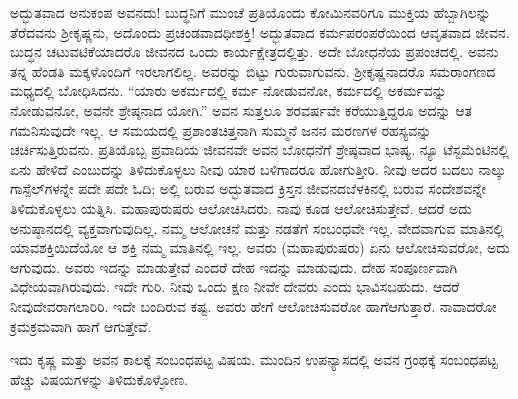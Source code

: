 ಅದ್ಭುತವಾದ ಅನುಕಂಪ ಅವನದು! ಬುದ್ಧನಿಗೆ ಮುಂಚೆ ಪ್ರತಿಯೊಂದು ಕೋಮಿನವರಿಗೂ ಮುಕ್ತಿಯ ಹೆಬ್ಬಾಗಿಲನ್ನು ತೆರೆದವನು ಶ‍್ರೀಕೃಷ್ಣನು, ಅದೊಂದು ಪ್ರಚಂಡವಾದ\break ಧೀಶಕ್ತಿ! ಅದ್ಭುತವಾದ ಕರ್ಮಪರಂಪರೆಯಿಂದ ಆವೃತವಾದ ಜೀವನ. ಬುದ್ಧನ ಚಟುವಟಿಕೆ\-ಯಾದರೊ ಜೀವನದ ಒಂದು ಕಾರ್ಯಕ್ಷೇತ್ರದಲ್ಲಿತ್ತು. ಅದೇ ಬೋಧನೆಯ ಪ್ರಪಂಚದಲ್ಲಿ. ಅವನು ತನ್ನ ಹೆಂಡತಿ ಮಕ್ಕಳೊಂದಿಗೆ ಇರಲಾಗಲಿಲ್ಲ. ಅವರನ್ನು ಬಿಟ್ಟು ಗುರುವಾಗುವನು. ಶ‍್ರೀಕೃಷ್ಣನಾದರೊ ಸಮರಾಂಗಣದ ಮಧ್ಯದಲ್ಲಿ ಬೋಧಿಸಿದನು. “ಯಾರು ಅಕರ್ಮದಲ್ಲಿ ಕರ್ಮ ನೋಡುವನೋ, ಕರ್ಮದಲ್ಲಿ ಅಕರ್ಮವನ್ನು ನೋಡುವನೋ, ಅವನೇ ಶ್ರೇಷ್ಠನಾದ ಯೋಗಿ.” ಅವನ ಸುತ್ತಲೂ ಶರವರ್ಷವೇ ಕರೆಯುತ್ತಿದ್ದರೂ ಅದನ್ನು ಆತ ಗಮನಿಸುವುದೇ ಇಲ್ಲ. ಆ ಸಮಯದಲ್ಲಿ ಪ್ರಶಾಂತಚಿತ್ತನಾಗಿ ಸುಮ್ಮನೆ ಜನನ ಮರಣಗಳ ರಹಸ್ಯವನ್ನು ಚರ್ಚಿಸುತ್ತಿರುವನು. ಪ್ರತಿಯೊಬ್ಬ ಪ್ರವಾದಿಯ ಜೀವನವೇ ಅವನ ಬೋಧನೆಗೆ ಶ್ರೇಷ್ಠವಾದ ಭಾಷ್ಯ. ನ್ಯೂ ಟೆಸ್ಟಮೆಂಟಿನಲ್ಲಿ ಏನು ಹೇಳಿದೆ ಎಂಬುದನ್ನು ತಿಳಿದುಕೊಳ್ಳಲು ನೀವು ಯಾರ ಬಳಿಗಾದರೂ ಹೋಗುತ್ತೀರಿ. ನೀವು ಅದರ ಬದಲು ನಾಲ್ಕು ಗಾಸ್ಪೆಲ್​ಗಳನ್ನೇ ಪದೇ ಪದೇ ಓದಿ; ಅಲ್ಲಿ ಬರುವ ಅದ್ಭುತವಾದ ಕ್ರಿಸ್ತನ ಜೀವನದ\break ಬೆಳಕಿನಲ್ಲಿ ಬರುವ ಸಂದೇಶವನ್ನೇ ತಿಳಿದುಕೊಳ್ಳಲು ಯತ್ನಿಸಿ. ಮಹಾಪುರುಷರು ಆಲೋಚಿಸಿದರು. ನಾವು ಕೂಡ ಆಲೋಚಿಸುತ್ತೇವೆ. ಆದರೆ ಅದು ಅನುಷ್ಠಾನದಲ್ಲಿ ವ್ಯಕ್ತವಾಗುವುದಿಲ್ಲ. ನಮ್ಮ ಆಲೋಚನೆ ಮತ್ತು ನಡತೆಗೆ ಸಂಬಂಧವೇ ಇಲ್ಲ. ವೇದವಾಗುವ ಮಾತಿನಲ್ಲಿ ಯಾವ\break ಶಕ್ತಿಯಿದೆಯೋ ಆ ಶಕ್ತಿ ನಮ್ಮ ಮಾತಿನಲ್ಲಿ ಇಲ್ಲ. ಅವರು (ಮಹಾಪುರುಷರು) ಏನು ಆಲೋಚಿಸುವರೋ, ಅದು ಆಗುವುದು. ಅವರು ಇದನ್ನು ಮಾಡುತ್ತೇವೆ ಎಂದರೆ ದೇಹ ಇದನ್ನು ಮಾಡುವುದು. ದೇಹ ಸಂಪೂರ್ಣವಾಗಿ ವಿಧೇಯವಾಗಿರುವುದು. ಇದೇ ಗುರಿ. ನೀವು ಒಂದು ಕ್ಷಣ ನೀವೇ ದೇವರು ಎಂದು ಭಾವಿಸಬಹುದು. ಆದರೆ ನೀವು\break ದೇವರಾಗಲಾರಿರಿ. ಇದೇ ಬಂದಿರುವ ಕಷ್ಟ. ಅವರು ಹೇಗೆ ಆಲೋಚಿಸುವರೋ ಹಾಗೆ\break ಆಗುತ್ತಾರೆ. ನಾವಾದರೋ ಕ್ರಮಕ್ರಮವಾಗಿ ಹಾಗೆ ಆಗುತ್ತೇವೆ.

ಇದು ಕೃಷ್ಣ ಮತ್ತು ಅವನ ಕಾಲಕ್ಕೆ ಸಂಬಂಧಪಟ್ಟ ವಿಷಯ. ಮುಂದಿನ ಉಪನ್ಯಾಸದಲ್ಲಿ ಅವನ ಗ್ರಂಥಕ್ಕೆ ಸಂಬಂಧಪಟ್ಟ ಹೆಚ್ಚು ವಿಷಯಗಳನ್ನು ತಿಳಿದುಕೊಳ್ಳೋಣ.

